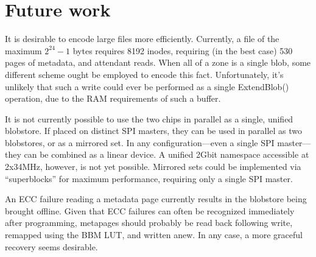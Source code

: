\documentclass[letterpaper,10pt]{article}
\begin{document}
\section{Future work}
It is desirable to encode large files more efficiently. Currently, a file of
the maximum $2^{24}-1$ bytes requires 8192 inodes, requiring (in the best case)
530 pages of metadata, and attendant reads. When all of a zone is a single
blob, some different scheme ought be employed to encode this fact.
Unfortunately, it's unlikely that such a write could ever be performed as a
single ExtendBlob() operation, due to the RAM requirements of such a buffer.

It is not currently possible to use the two chips in parallel as a single,
unified blobstore. If placed on distinct SPI masters, they can be used in
parallel as two blobstores, or as a mirrored set. In any configuration---even
a single SPI master---they can be combined as a linear device. A unified
2Gbit namespace accessible at 2x34MHz, however, is not yet possible. Mirrored
sets could be implemented via ``superblocks''\parencite{superblocks} for
maximum performance, requiring only a single SPI master.

An ECC failure reading a metadata page currently results in the blobstore being
brought offline. Given that ECC failures can often be recognized immediately
after programming, metapages should probably be read back following write,
remapped using the BBM LUT, and written anew. In any case, a more graceful
recovery seems desirable.

\printbibliography
\end{document}
